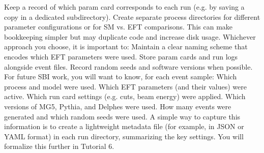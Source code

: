 \markdownRendererUlItem Keep a record of which param card corresponds to each run (e.g. by saving a copy in a dedicated subdirectory).\markdownRendererUlItemEnd 
\markdownRendererUlEndTight \markdownRendererUlItemEnd 
\markdownRendererUlItem {}\markdownRendererInterblockSeparator
{}\markdownRendererUlBeginTight
\markdownRendererUlItem Create separate process directories for different parameter configurations or for SM vs. EFT comparisons.\markdownRendererUlItemEnd 
\markdownRendererUlItem This can make bookkeeping simpler but may duplicate code and increase disk usage.\markdownRendererUlItemEnd 
\markdownRendererUlEndTight \markdownRendererUlItemEnd 
\markdownRendererUlEnd \markdownRendererInterblockSeparator
{}Whichever approach you choose, it is important to:\markdownRendererInterblockSeparator
{}\markdownRendererUlBeginTight
\markdownRendererUlItem Maintain a clear naming scheme that encodes which EFT parameters were used.\markdownRendererUlItemEnd 
\markdownRendererUlItem Store param cards and run logs alongside event files.\markdownRendererUlItemEnd 
\markdownRendererUlItem Record random seeds and software versions when possible.\markdownRendererUlItemEnd 
\markdownRendererUlEndTight \markdownRendererInterblockSeparator
{}
\markdownRendererSectionEnd \markdownRendererSectionBegin
{}\markdownRendererInterblockSeparator
{}For future SBI work, you will want to know, for each event sample:\markdownRendererInterblockSeparator
{}\markdownRendererUlBeginTight
\markdownRendererUlItem Which process and model were used.\markdownRendererUlItemEnd 
\markdownRendererUlItem Which EFT parameters (and their values) were active.\markdownRendererUlItemEnd 
\markdownRendererUlItem Which run card settings (e.g. cuts, beam energy) were applied.\markdownRendererUlItemEnd 
\markdownRendererUlItem Which versions of MG5, Pythia, and Delphes were used.\markdownRendererUlItemEnd 
\markdownRendererUlItem How many events were generated and which random seeds were used.\markdownRendererUlItemEnd 
\markdownRendererUlEndTight \markdownRendererInterblockSeparator
{}A simple way to capture this information is to create a lightweight metadata file (for example, in JSON or YAML format) in each run directory, summarizing the key settings. You will formalize this further in Tutorial 6.\markdownRendererInterblockSeparator
{}\markdownRendererThematicBreak{}\markdownRendererInterblockSeparator
{}
\markdownRendererSectionEnd 
\markdownRendererSectionEnd \markdownRendererSectionBegin
